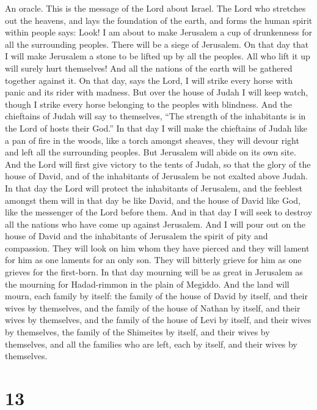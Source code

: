  An oracle. This is the message of the Lord about Israel.
The Lord who stretches out the heavens, and lays the foundation of the
earth, and forms the human spirit within people says:  Look!
I am about to make Jerusalem a cup of drunkenness for all the
surrounding peoples. There will be a siege of Jerusalem.  On
that day that I will make Jerusalem a stone to be lifted up by all the
peoples. All who lift it up will surely hurt themselves! And all the
nations of the earth will be gathered together against it. 
On that day, says the Lord, I will strike every horse with panic and its
rider with madness. But over the house of Judah I will keep watch,
though I strike every horse belonging to the peoples with blindness.
 And the chieftains of Judah will say to themselves, ``The
strength of the inhabitants is in the Lord of hosts their God.''
 In that day I will make the chieftains of Judah like a pan
of fire in the woods, like a torch amongst sheaves, they will devour
right and left all the surrounding peoples. But Jerusalem will abide on
its own site.  And the Lord will first give victory to the
tents of Judah, so that the glory of the house of David, and of the
inhabitants of Jerusalem be not exalted above Judah.  In
that day the Lord will protect the inhabitants of Jerusalem, and the
feeblest amongst them will in that day be like David, and the house of
David like God, like the messenger of the Lord before them. 
And in that day I will seek to destroy all the nations who have come up
against Jerusalem.  And I will pour out on the house of
David and the inhabitants of Jerusalem the spirit of pity and
compassion. They will look on him whom they have pierced and they will
lament for him as one laments for an only son. They will bitterly grieve
for him as one grieves for the first-born.  In that day
mourning will be as great in Jerusalem as the mourning for Hadad-rimmon
in the plain of Megiddo.  And the land will mourn, each
family by itself: the family of the house of David by itself, and their
wives by themselves, and the family of the house of Nathan by itself,
and their wives by themselves,  and the family of the house
of Levi by itself, and their wives by themselves, the family of the
Shimeites by itself, and their wives by themselves,  and
all the families who are left, each by itself, and their wives by
themselves.

\hypertarget{section-12}{%
\section{13}\label{section-12}}

